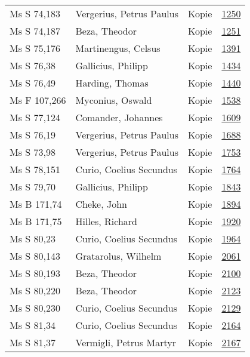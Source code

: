\documentclass[10pt,a4paper,landscape]{report}
\begin{document}
\begin{longtable}{p{16cm}p{4cm}lr}
Ms S 74,183	&	Vergerius, Petrus Paulus	&	Kopie	&	\href{http://130.60.24.72/assignment/1250}{1250}\\
Ms S 74,187	&	Beza, Theodor	&	Kopie	&	\href{http://130.60.24.72/assignment/1251}{1251}\\
Ms S 75,176	&	Martinengus, Celsus	&	Kopie	&	\href{http://130.60.24.72/assignment/1391}{1391}\\
Ms S 76,38	&	Gallicius, Philipp	&	Kopie	&	\href{http://130.60.24.72/assignment/1434}{1434}\\
Ms S 76,49	&	Harding, Thomas	&	Kopie	&	\href{http://130.60.24.72/assignment/1440}{1440}\\
Ms F 107,266	&	Myconius, Oswald	&	Kopie	&	\href{http://130.60.24.72/assignment/1538}{1538}\\
Ms S 77,124	&	Comander, Johannes	&	Kopie	&	\href{http://130.60.24.72/assignment/1609}{1609}\\
Ms S 76,19	&	Vergerius, Petrus Paulus	&	Kopie	&	\href{http://130.60.24.72/assignment/1688}{1688}\\
Ms S 73,98	&	Vergerius, Petrus Paulus	&	Kopie	&	\href{http://130.60.24.72/assignment/1753}{1753}\\
Ms S 78,151	&	Curio, Coelius Secundus	&	Kopie	&	\href{http://130.60.24.72/assignment/1764}{1764}\\
Ms S 79,70	&	Gallicius, Philipp	&	Kopie	&	\href{http://130.60.24.72/assignment/1843}{1843}\\
Ms B 171,74	&	Cheke, John	&	Kopie	&	\href{http://130.60.24.72/assignment/1894}{1894}\\
Ms B 171,75	&	Hilles, Richard	&	Kopie	&	\href{http://130.60.24.72/assignment/1920}{1920}\\
Ms S 80,23	&	Curio, Coelius Secundus	&	Kopie	&	\href{http://130.60.24.72/assignment/1964}{1964}\\
Ms S 80,143	&	Gratarolus, Wilhelm	&	Kopie	&	\href{http://130.60.24.72/assignment/2061}{2061}\\
Ms S 80,193	&	Beza, Theodor	&	Kopie	&	\href{http://130.60.24.72/assignment/2100}{2100}\\
Ms S 80,220	&	Beza, Theodor	&	Kopie	&	\href{http://130.60.24.72/assignment/2123}{2123}\\
Ms S 80,230	&	Curio, Coelius Secundus	&	Kopie	&	\href{http://130.60.24.72/assignment/2129}{2129}\\
Ms S 81,34	&	Curio, Coelius Secundus	&	Kopie	&	\href{http://130.60.24.72/assignment/2164}{2164}\\
Ms S 81,37	&	Vermigli, Petrus Martyr	&	Kopie	&	\href{http://130.60.24.72/assignment/2167}{2167}\\

\end{longtable}
\end{document}
